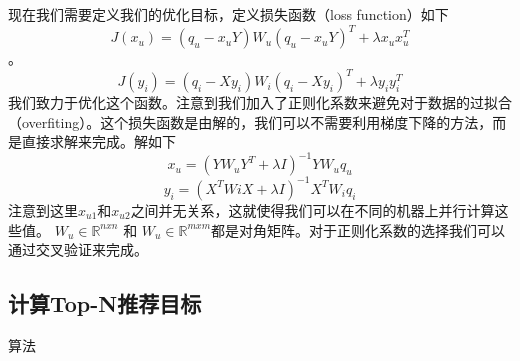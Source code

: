 现在我们需要定义我们的优化目标，定义损失函数（loss function）如下
$$J(x_u) = (q_u - x_u Y) W_u (q_u - x_u Y)^T + \lambda x_u x_u^T$$。
$$J(y_i) = (q_i - X y_i) W_i (q_i - X y_i)^T + \lambda y_i y_i^T$$
我们致力于优化这个函数。注意到我们加入了正则化系数来避免对于数据的过拟合（overfiting）。这个损失函数是由解的，我们可以不需要利用梯度下降的方法，而是直接求解来完成。解如下
$$x_u = (Y W_u Y^T + \lambda I)^{-1} Y W_u q_u$$
$$y_i = (X^T Wi X + \lambda I)^{-1} X^T W_i q_i$$
注意到这里$x_{u1}$和$x_{u2}$之间并无关系，这就使得我们可以在不同的机器上并行计算这些值。
$W_u \in \mathbb{R}^{nxn}$ 和
$W_u \in \mathbb{R}^{mxm}$都是对角矩阵。对于正则化系数的选择我们可以通过交叉验证来完成。
\subsection{计算Top-N推荐目标}
算法
%
